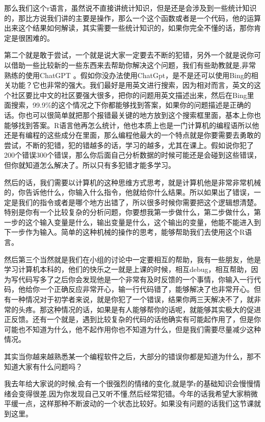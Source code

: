 \documentclass[
  oneside]{book}
\begin{document}
那么我们这个r语言，虽然说不直接讲统计知识，但是还是会涉及到一些统计知识的，那比方说我们讲的主要是操作，那么一个这个函数或者是一个代码，他的运算出来这个结果如何解读，其实需要一些统计知识的，如果你完全不懂的话，那你肯定是很困难的。

第二个就是敢于尝试，一个就是说大家一定要去不断的犯错，另外一个就是说你可以借助一些比较新的一些东西来去帮助你解决这个问题，我们有些助教就是,非常熟练的使用ChatGPT 。假如你没办法使用ChatGpt，是不是还可以使用Bing的相关功能？它也非常的强大。我们最好是用英文进行搜索，因为相对而言，英文的这个社区要比中文的社区要强大很多，把你的问题用英文描述出来，然后在Bing里面搜索，99.9\%的这个情况之下你都能够找到答案，如果你的问题描述是正确的话。你也可以很简单就把那个报错最关键的地方放到这个搜索框里面，基本上你也能够找到答案。R语言他再怎么统计，他也本质上也是一门计算机的编程语所以他还是有编程的这些成分在里面，那么编程他最大的一个特点就是你要需要去勇敢的尝试，不断的犯错，犯的错越多的话，学习的越多，尤其在课上。假如说你犯了200个错误300个错误，那么你后面自己分析数据的时候可能还是会碰到这些错误，但你就知道怎么解决了。所以只有多犯错才能多学习。

然后的话，我们需要以计算机的这种思维方式思考，就是计算机他是非常非常机械的，你告诉他什么，你输入什么指令，他就给你什么结果。所以如果出了错误，一定是我们的指令或者是哪个地方出错了，所以很多时候你需要把这个逻辑想清楚。特别是你有一个比较复杂的分析问题，你要想我第一步做什么，第二步做什么，第一步的这个输入变量是什么，输出变量是什么，这个输出的变量，他能不能进入到下一步作为输入。简单的这种机械的操作的思考，能够帮助我们去使用这个R语言。

然后第三个当然就是我们在小组的讨论中一定要相互的帮助，我有一些朋友，他是学习计算机本科的，他们的快乐之一就是上课的时候，相互debug，相互帮助，因为写代码写多了之后你会发现他是一个非常有及时反馈的一个事情，你输入一行代码，他给你一个正确反应非常开心，输一行代码错了，能够解决了也非常开心。但有一种情况对于初学者来说，就是你犯了一个错误，结果你两三天解决不了，就非常的头疼。那这种情况的话，如果是有人能够帮你的话呢，就能够其实极大的促进正反馈。还有一个就是，遇到比较复杂的代码的话他确实有可能起作用了，但是你可能也不知道为什么，他不起作用你也不知道为什么，但是我们需要尽量减少这种情况。

其实当你越来越熟悉某一个编程软件之后，大部分的错误你都是知道为什么，那不知道大家有什么问题吗？

我去年给大家说的时候,会有一个很强烈的情绪的变化,就是学r的基础知识会慢慢情绪会变得很差,因为你发现自己又听不懂,然后经常犯错。今年的话我希望大家稍微平缓一点，这样那种不断波动的一个状态比较好。如果没有问题的话我们这节课就到这里。

\printbibliography
\end{document}
